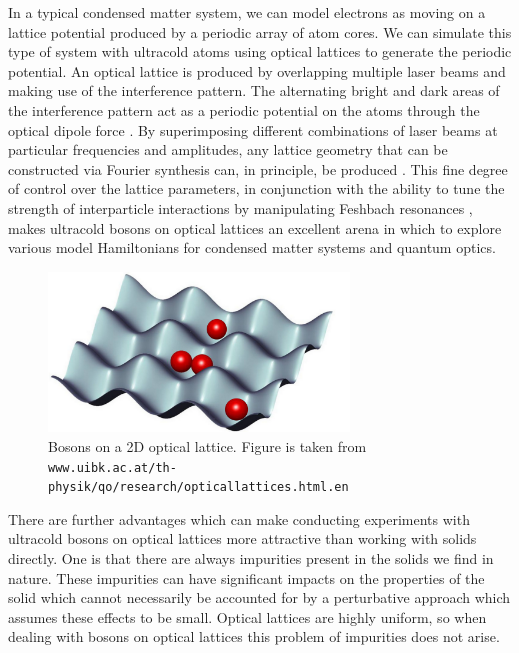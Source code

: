 \documentclass[a4paper,10pt]{article}
\theoremstyle{plain}
\begin{document}
In a typical condensed matter system, we can model electrons as moving on a
lattice potential produced by a periodic array of atom cores. We can simulate
this type of system with ultracold atoms using optical lattices to generate the
periodic potential. An optical lattice is produced by overlapping multiple laser
beams and making use of the interference pattern. The alternating bright and
dark areas of the interference pattern act as a periodic potential on the atoms
through the optical dipole force \cite{Bloch2012}. By superimposing different
combinations of laser beams at particular frequencies and amplitudes, any
lattice geometry that can be constructed via Fourier synthesis can, in
principle, be produced \cite{Bloch2012}. This fine degree of control over the
lattice parameters, in conjunction with the ability to tune the strength of
interparticle interactions by manipulating Feshbach resonances \cite{Chin2010},
makes ultracold bosons on optical lattices an excellent arena in which to
explore various model Hamiltonians for condensed matter systems and quantum
optics.
\begin{figure}[bh!]
    \begin{center}
        \includegraphics[width=8cm]{bosons_on_lattice}
    \end{center}
    \caption{Bosons on a 2D optical lattice. Figure is taken from\newline
             \texttt{www.uibk.ac.at/th-physik/qo/research/opticallattices.html.en}
            }
\end{figure}
There are further advantages which can make conducting experiments with
ultracold bosons on optical lattices more attractive than working with solids
directly. One is that there are always impurities present in the solids we find
in nature. These impurities can have significant impacts on the properties of
the solid which cannot necessarily be accounted for by a perturbative approach
which assumes these effects to be small. Optical lattices are highly uniform, so when
dealing with bosons on optical lattices this problem of impurities does not
arise.
\end{document}
